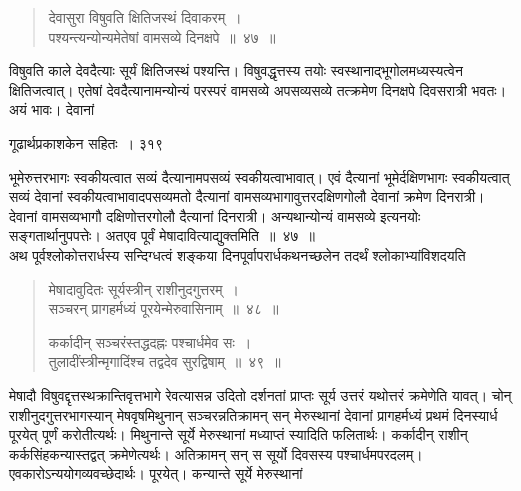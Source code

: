 \documentclass[11pt, openany]{book}
\begin{document}
\begin{quote}
 {\ssi देवासुरा विषुवति क्षितिजस्थं दिवाकरम्~।\\
पश्यन्त्यन्योन्यमेतेषां वामसव्ये दिनक्षपे~॥~४७~॥}
\end{quote}

 विषुवति काले देवदैत्याः सूर्यं क्षितिजस्थं पश्यन्ति। विषुवद्धृत्तस्य तयोः स्वस्थानाद्भूगोलमध्यस्यत्वेन क्षितिजत्वात्। एतेषां देवदैत्यानामन्योन्यं परस्परं वामसव्ये अपसव्यसव्ये तत्क्रमेण दिनक्षपे दिवसरात्री भवतः। अयं भावः। देवानां \textendash



\newpage


\hspace{3cm} गूढार्थप्रकाशकेन सहितः~। \hfill ३१९
\vspace{1cm}


भूमेरुत्तरभागः स्वकीयत्वात सव्यं दैत्यानामपसव्यं स्वकीयत्वाभावात्। एवं दैत्यानां भूमेर्दक्षिणभागः स्वकीयत्वात् सव्यं देवानां स्वकीयत्वाभावादपसव्यमतो दैत्यानां वामसव्यभागावुत्तरदक्षिणगोलौ देवानां क्रमेण दिनरात्री। देवानां वामसव्यभागौ दक्षिणोत्तरगोलौ दैत्यानां दिनरात्री। अन्यथान्योन्यं वामसव्ये इत्यनयोः सङ्गतार्थानुपपत्तेः। अतएव पूर्वं मेषादावित्याद्युक्तमिति~॥~४७~॥\\
\noindent अथ पूर्वश्लोकोत्तरार्धस्य सन्दिग्धत्वं शङ्कया दिनपूर्वापरार्धकथनच्छलेन तदर्थं श्लोकाभ्यांविशदयति\textendash


\begin{quote}
 {\ssi मेषादावुदितः सूर्यस्त्रीन् राशीनुदगुत्तरम्~।\\
सञ्चरन् प्रागहर्मध्यं पूरयेन्मेरुवासिनाम्~॥~४८~॥

कर्कादीन् सञ्चरंस्तद्धदह्नः पश्चार्धमेव सः~।\\
तुलादींस्त्रीन्मृगादिंश्च तद्वदेव सुरद्विषाम्~॥~४९~॥}
\end{quote}

 मेषादौ विषुवद्दृत्तस्थक्रान्तिवृत्तभागे रेवत्यासन्न उदितो दर्शनतां प्राप्तः सूर्य उत्तरं यथोत्तरं क्रमेणेति यावत्। चोन् राशीनुदगुत्तरभागस्यान् मेषवृषमिथुनान् सञ्चरन्नतिक्रामन् सन् मेरुस्थानां देवानां प्रागहर्मध्यं प्रथमं दिनस्यार्ध पूरयेत् पूर्णं करोतीत्यर्थः। मिथुनान्ते सूर्ये मेरुस्थानां मध्याप्तं स्यादिति फलितार्थः। कर्कादीन् राशीन् कर्कसिंहकन्यास्तद्वत् क्रमेणेत्यर्थः। अतिक्रामन् सन् स सूर्यो दिवसस्य पश्चार्धमपरदलम्। एवकारोऽन्ययोगव्यवच्छेदार्थः। पूरयेत्। कन्यान्ते सूर्ये मेरुस्थानां \textendash
\end{document}
